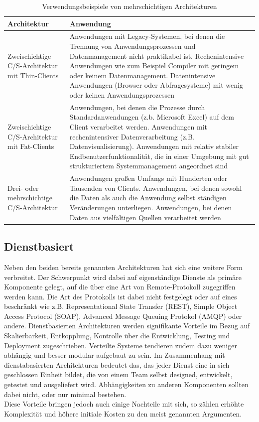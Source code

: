 	\begin{table}[h]
	\begin{tabular}{|p{3.5cm}|p{12.5cm}|}
		\hline 
		\textbf{Architektur} & \textbf{Anwendung} \\ 
		\hline 
		Zweischichtige C/S-Architektur mit Thin-Clients & Anwendungen mit Legacy-Systemen, bei denen die Trennung von Anwendungsprozessen und Datenmanagement nicht praktikabel ist. Rechenintensive Anwendungen wie zum Beispiel Compiler mit geringem oder keinem Datenmanagement. Datenintensive Anwendungen (Browser oder Abfragesysteme) mit wenig oder keinen Anwendungsprozessen \\
		\hline 
		Zweischichtige C/S-Architektur mit Fat-Clients & Anwendungen, bei denen die Prozesse durch Standardanwendungen (z.b. Microsoft Excel) auf dem Client verarbeitet werden. Anwendungen mit rechenintensiver Datenverarbeitung (z.B. Datenvisualisierung). Anwendungen mit relativ stabiler Endbenutzerfunktionalität, die in einer Umgebung mit gut strukturiertem Systemmanagement angeordnet sind \\ 
		\hline 
		Drei- oder mehrschichtige C/S-Architektur & Anwendungen großen Umfangs mit Hunderten oder Tausenden von Clients. Anwendungen, bei denen sowohl die Daten als auch die Anwendung selbst ständigen Veränderungen unterliegen. Anwendungen, bei denen Daten aus vielfältigen Quellen verarbeitet werden \\ 
		\hline 
	\end{tabular} 
			\caption{Verwendungsbeispiele von mehrschichtigen Architekturen \cite{Sommerville.2007}}
	\end{table}
	
	
	\subsection{Dienstbasiert}
	Neben den beiden bereits genannten Architekturen hat sich eine weitere Form verbreitet. Der Schwerpunkt wird dabei auf eigenständige Dienste als primäre Komponente gelegt, auf die über eine Art von Remote-Protokoll zugegriffen werden kann. Die Art des Protokolls ist dabei nicht festgelegt oder auf eines beschränkt wie z.B. Representational State Transfer (REST), Simple Object Access Protocol (SOAP), Advanced Message Queuing Protokol (AMQP) oder andere.
	Dienstbasierten Architekturen werden signifikante Vorteile im Bezug auf Skalierbarkeit, Entkopplung, Kontrolle über die Entwicklung, Testing und Deployment zugeschrieben. Verteilte Systeme tendieren zudem dazu weniger abhängig und besser modular aufgebaut zu sein. Im Zusammenhang mit dienstabasierten Architekturen bedeutet das, das jeder Dienst eine in sich geschlossen Einheit bildet, die von einem Team selbst designed, entwickelt, getestet und ausgeliefert wird.  Abhängigkeiten zu anderen Komponenten sollten dabei nicht, oder nur minimal bestehen. \\
	Diese Vorteile bringen jedoch auch einige Nachteile mit sich, so zählen erhöhte Komplexität und höhere initiale Kosten zu den meist genannten Argumenten.
	
